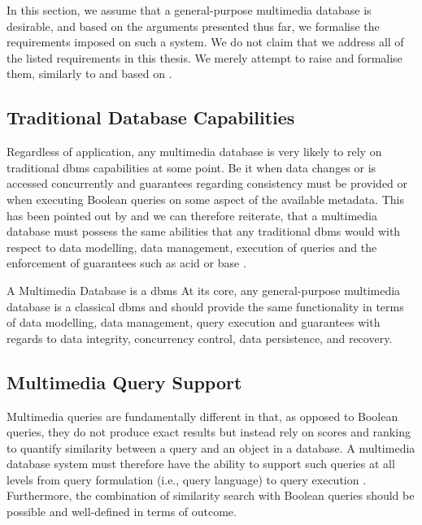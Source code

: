 In this section, we assume that a general-purpose multimedia database is desirable, and based on the arguments presented thus far, we formalise the requirements imposed on such a system. We do not claim that we address all of the listed requirements in this thesis. We merely attempt to raise and formalise them, similarly to and based on \cite{Adjeroh:1997Multimedia,Jonsson:2016Ten,Khaleel:2021An}.

\subsection{Traditional Database Capabilities}
Regardless of application, any multimedia database is very likely to rely on traditional \acrshort{dbms} capabilities at some point. Be it when data changes or is accessed concurrently and guarantees regarding consistency must be provided or when executing Boolean queries on some aspect of the available metadata. This has been pointed out by \cite{Adjeroh:1997Multimedia,Khaleel:2021An} and we can therefore reiterate, that a multimedia database must possess the same abilities that any traditional \acrshort{dbms} would with respect to data modelling, data management, execution of queries and the enforcement of guarantees such as \acrshort{acid} \cite{Haerder:1983principles} or \acrshort{base} \cite{Pritchett:2008Base}.

\begin{requirement}[label=requirement:classical_dbms]{A Multimedia Database is a \acrshort{dbms}}{}
    At its core, any general-purpose multimedia database is a classical \acrlong{dbms} and should provide the same functionality in terms of data modelling, data management, query execution and guarantees with regards to data integrity, concurrency control, data persistence, and recovery.
\end{requirement}

\subsection{Multimedia Query Support}
Multimedia queries are fundamentally different in that, as opposed to Boolean queries, they do not produce exact results but instead rely on scores and ranking to quantify similarity between a query and an object in a database. A multimedia database system must therefore have the ability to support such queries at all levels from query formulation (i.e., query language) to query execution \cite{Adjeroh:1997Multimedia}. Furthermore, the combination of similarity search with Boolean queries should be possible and well-defined in terms of outcome.

